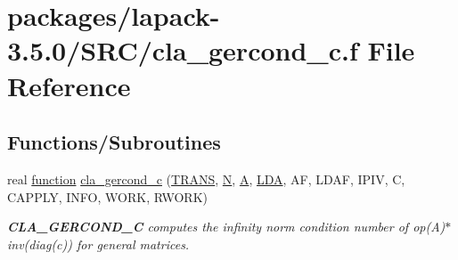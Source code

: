 \hypertarget{cla__gercond__c_8f}{}\section{packages/lapack-\/3.5.0/\+S\+R\+C/cla\+\_\+gercond\+\_\+c.f File Reference}
\label{cla__gercond__c_8f}
\subsection*{Functions/\+Subroutines}
\begin{DoxyCompactItemize}
\item 
real \hyperlink{afunc_8m_a7b5e596df91eadea6c537c0825e894a7}{function} \hyperlink{group__complexGEcomputational_ga3c43cd4abafdf0471ce472659e5beaa4}{cla\+\_\+gercond\+\_\+c} (\hyperlink{superlu__enum__consts_8h_a0c4e17b2d5cea33f9991ccc6a6678d62a1f61e3015bfe0f0c2c3fda4c5a0cdf58}{T\+R\+A\+N\+S}, \hyperlink{polmisc_8c_a0240ac851181b84ac374872dc5434ee4}{N}, \hyperlink{classA}{A}, \hyperlink{example__user_8c_ae946da542ce0db94dced19b2ecefd1aa}{L\+D\+A}, A\+F, L\+D\+A\+F, I\+P\+I\+V, C, C\+A\+P\+P\+L\+Y, I\+N\+F\+O, W\+O\+R\+K, R\+W\+O\+R\+K)
\begin{DoxyCompactList}\small\item\em {\bfseries C\+L\+A\+\_\+\+G\+E\+R\+C\+O\+N\+D\+\_\+\+C} computes the infinity norm condition number of op(\+A)$\ast$inv(diag(c)) for general matrices. \end{DoxyCompactList}\end{DoxyCompactItemize}
